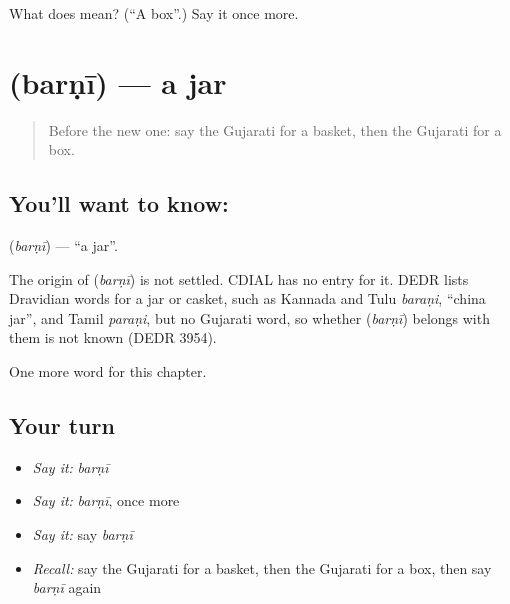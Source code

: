 \begin{tcolorbox}[breakable,colback=teal!4,colframe=teal!35!black,title={Before you move on}]
What does  mean? (\textquotedblleft{}A box\textquotedblright{}.) Say it once more.
\end{tcolorbox}
\section[\texorpdfstring{\gu{બરણી} (barṇī)}{બરણી (barṇī)}]{ (barṇī) — a jar}

\label{lesson:GU-C110-barni}



\begin{quote}
Before the new one: say the Gujarati for a basket, then the Gujarati for a box.
\end{quote}

\subsection*{You'll want to know: }
\textbf{} (\emph{barṇī}) — \textquotedblleft{}a jar\textquotedblright{}.

\begin{cousinweb}
The origin of \textbf{} (\emph{barṇī}) is not settled. CDIAL has no entry for it. DEDR lists Dravidian words for a jar or casket, such as Kannada and Tulu \emph{baraṇi}, \textquotedblleft{}china jar\textquotedblright{}, and Tamil \emph{paraṇi}, but no Gujarati word, so whether \textbf{} (\emph{barṇī}) belongs with them is not known (DEDR 3954).
\end{cousinweb}

\begin{grammarlens}[title={What you've built}]
One more word for this chapter.
\end{grammarlens}

\subsection*{Your turn}
\begin{itemize}
\raggedright
  \item \emph{Say it:} \emph{barṇī}
  \item \emph{Say it:} \emph{barṇī}, once more
  \item \emph{Say it:} say \emph{barṇī}
  \item \emph{Recall:} say the Gujarati for a basket, then the Gujarati for a box, then say \emph{barṇī} again
\end{itemize}


